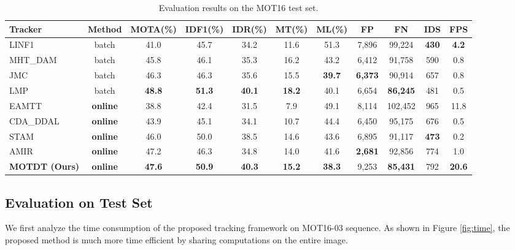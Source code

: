 \documentclass{article}
\begin{document}
\begin{table*}
\centering
\small
\begin{threeparttable}
\caption{Evaluation results on the MOT16 test set.}
\label{table:test}
\begin{tabular}{@{}lc|cccccccc|c@{}}
\toprule
\textbf{Tracker} & \textbf{Method} & \textbf{MOTA(\%)} & \textbf{IDF1(\%)} & \textbf{IDR(\%)} & \textbf{MT(\%)} & \textbf{ML(\%)} & \textbf{FP} & \textbf{FN} & \textbf{IDS} & \textbf{FPS} \\ 
\midrule
LINF1 \cite{fagot2016improving} & batch & 41.0 & 45.7 & 34.2 & 11.6 & 51.3 & 7,896 & 99,224 & \textbf{430} & \textbf{4.2} \\
MHT\_DAM \cite{kim2015multiple} & batch & 45.8 & 46.1 & 35.3 & 16.2 & 43.2 & 6,412 & 91,758 & 590 & 0.8 \\
JMC \cite{tang2016multi} & batch & 46.3 & 46.3 & 35.6 & 15.5 & \textbf{39.7} & \textbf{6,373} & 90,914 & 657 & 0.8 \\
LMP \cite{tang2017multiple} & batch & \textbf{48.8} & \textbf{51.3} & \textbf{40.1} & \textbf{18.2} & 40.1 & 6,654 & \textbf{86,245} & 481 & 0.5 \\
\midrule
EAMTT \cite{sanchez2016online}  & \textbf{online} & 38.8 & 42.4 & 31.5 & 7.9 & 49.1 & 8,114 & 102,452 & 965 & 11.8 \\
CDA\_DDAL \cite{bae2017confidence} & \textbf{online} & 43.9 & 45.1 & 34.1 & 10.7 & 44.4 & 6,450 & 95,175 & 676 & 0.5 \\  
STAM \cite{chu2017online} & \textbf{online} & 46.0 & 50.0 & 38.5 & 14.6 & 43.6 & 6,895 & 91,117 & \textbf{473} & 0.2\\
AMIR \cite{sadeghian2017tracking} & \textbf{online} & 47.2 & 46.3 & 34.8 & 14.0 & 41.6 & \textbf{2,681} & 92,856 & 774 & 1.0 \\
\midrule
\textbf{MOTDT (Ours)} & \textbf{online} & \textbf{47.6} & \textbf{50.9} & \textbf{40.3} & \textbf{15.2} & \textbf{38.3} & 9,253 & \textbf{85,431} & 792 & \textbf{20.6} \\
\bottomrule
\end{tabular}
\end{threeparttable}
\end{table*}

\subsection{Evaluation on Test Set}
We first analyze the time consumption of the proposed tracking framework on MOT16-03 sequence.
As shown in Figure \ref{fig:time}, 
the proposed method is much more time efficient by sharing computations on the entire image. 
\end{document}
